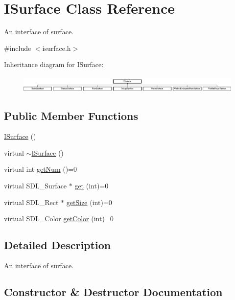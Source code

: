 \hypertarget{class_i_surface}{}\section{I\+Surface Class Reference}
\label{class_i_surface}


An interface of surface.  




{\ttfamily \#include $<$isurface.\+h$>$}

Inheritance diagram for I\+Surface\+:\begin{figure}[H]
\begin{center}
\leavevmode
\includegraphics[height=0.860215cm]{class_i_surface}
\end{center}
\end{figure}
\subsection*{Public Member Functions}
\begin{DoxyCompactItemize}
\item 
\mbox{\hyperlink{class_i_surface_ab70567ef2d1f791659441e6d511d5181}{I\+Surface}} ()
\item 
virtual \mbox{\hyperlink{class_i_surface_a72497ade5e82ef16d2a3c9dfde51428a}{$\sim$\+I\+Surface}} ()
\item 
virtual int \mbox{\hyperlink{class_i_surface_a1553f92deac310771e6fe63d62fc1d95}{get\+Num}} ()=0
\item 
virtual S\+D\+L\+\_\+\+Surface $\ast$ \mbox{\hyperlink{class_i_surface_a45bacb1ffa6f0835e3ece0123b90c4fc}{get}} (int)=0
\item 
virtual S\+D\+L\+\_\+\+Rect $\ast$ \mbox{\hyperlink{class_i_surface_ae0b5040cd0eaa1897f61f994f7b2eacf}{get\+Size}} (int)=0
\item 
virtual S\+D\+L\+\_\+\+Color \mbox{\hyperlink{class_i_surface_adf609edb8f871bf37ed9aaf8fe0d2695}{get\+Color}} (int)=0
\end{DoxyCompactItemize}


\subsection{Detailed Description}
An interface of surface. 

\subsection{Constructor \& Destructor Documentation}
\mbox{\label{class_i_surface_ab70567ef2d1f791659441e6d511d5181}} 

